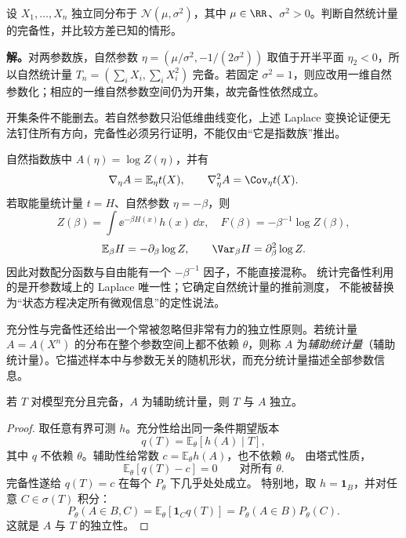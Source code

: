 \begin{workedexample}[正态两参数族的完备性]
设 $X_1,\ldots,X_n$ 独立同分布于 $\mathcal N(\mu,\sigma^2)$，其中 $\mu\in\RR$、$\sigma^2>0$。判断自然统计量的完备性，并比较方差已知的情形。

\textbf{解。}对两参数族，自然参数 $\eta=(\mu/\sigma^2,-1/(2\sigma^2))$ 取值于开半平面 $\eta_2<0$，所以自然统计量 $T_n=(\sum_i X_i,\sum_i X_i^2)$ 完备。若固定 $\sigma^2=1$，则应改用一维自然参数化；相应的一维自然参数空间仍为开集，故完备性依然成立。
\end{workedexample}

\begin{note}[曲线参数域须另证完备性]
开集条件不能删去。若自然参数只沿低维曲线变化，上述 Laplace 变换论证便无法钉住所有方向，完备性必须另行证明，不能仅由“它是指数族”推出。
\end{note}


\begin{note}[配分函数的统计含义]
自然指数族中 $A(\eta)=\log Z(\eta)$，并有
\[
 \nabla_\eta A=\mathbb E_\eta t(X),\qquad
 \nabla_\eta^2A=\Cov_\eta t(X).
\]
若取能量统计量 $t=H$、自然参数 $\eta=-\beta$，则
\[
 Z(\beta)=\int \ee^{-\beta H(x)}h(x)\,\dd x,\quad
 F(\beta)=-\beta^{-1}\log Z(\beta),
\]
\[
 \mathbb E_\beta H=-\partial_\beta\log Z,\qquad
 \Var_\beta H=\partial_\beta^2\log Z.
\]
因此对数配分函数与自由能有一个 $-\beta^{-1}$ 因子，不能直接混称。
统计完备性利用的是开参数域上的 Laplace 唯一性；它确定自然统计量的推前测度，
不能被替换为“状态方程决定所有微观信息”的定性说法。
\end{note}

\begin{definition}[辅助统计量]
充分性与完备性还给出一个常被忽略但非常有力的独立性原则。若统计量 $A=A(X^n)$ 的分布在整个参数空间上都不依赖 $\theta$，则称 $A$ 为\emph{辅助统计量}（辅助统计量）。它描述样本中与参数无关的随机形状，而充分统计量描述全部参数信息。
\end{definition}

\begin{theorem}[Basu 定理]
若 $T$ 对模型充分且完备，$A$ 为辅助统计量，则 $T$ 与 $A$ 独立。
\end{theorem}


\begin{proof}
取任意有界可测 $h$。充分性给出同一条件期望版本
\[
 q(T)=\mathbb E_\theta[h(A)\mid T],
\]
其中 $q$ 不依赖 $\theta$。辅助性给常数 $c=\mathbb E_\theta h(A)$，也不依赖 $\theta$。
由塔式性质，
\[
 \mathbb E_\theta[q(T)-c]=0\qquad\text{对所有 }\theta.
\]
完备性遂给 $q(T)=c$ 在每个 $P_\theta$ 下几乎处处成立。
特别地，取 $h=\mathbf1_B$，并对任意 $C\in\sigma(T)$ 积分：
\[
 P_\theta(A\in B,C)
 =\mathbb E_\theta[\mathbf1_C q(T)]
 =P_\theta(A\in B)P_\theta(C).
\]
这就是 $A$ 与 $T$ 的独立性。
\end{proof}

